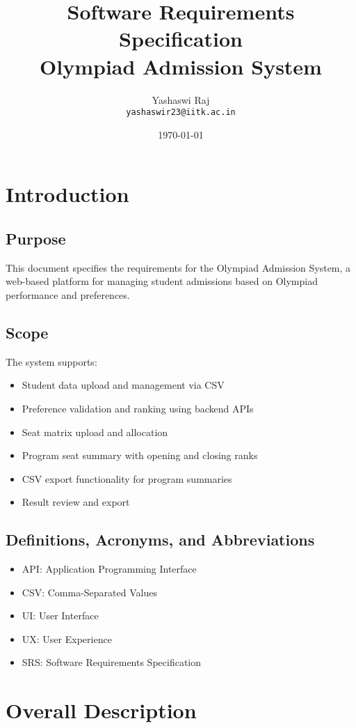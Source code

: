 \documentclass[12pt,a4paper]{article}
\title{Software Requirements Specification\\Olympiad Admission System}
\author{Yashaswi Raj\\\texttt{yashaswir23@iitk.ac.in}}
\date{\today}
\begin{document}
\maketitle

\tableofcontents
\newpage

\section{Introduction}
\subsection{Purpose}
This document specifies the requirements for the Olympiad Admission System, a web-based platform for managing student admissions based on Olympiad performance and preferences.

\subsection{Scope}
The system supports:
\begin{itemize}
    \item Student data upload and management via CSV
    \item Preference validation and ranking using backend APIs
    \item Seat matrix upload and allocation
    \item Program seat summary with opening and closing ranks
    \item CSV export functionality for program summaries
    \item Result review and export
\end{itemize}

\subsection{Definitions, Acronyms, and Abbreviations}
\begin{itemize}
    \item API: Application Programming Interface
    \item CSV: Comma-Separated Values
    \item UI: User Interface
    \item UX: User Experience
    \item SRS: Software Requirements Specification
\end{itemize}

\section{Overall Description}
\end{document}
